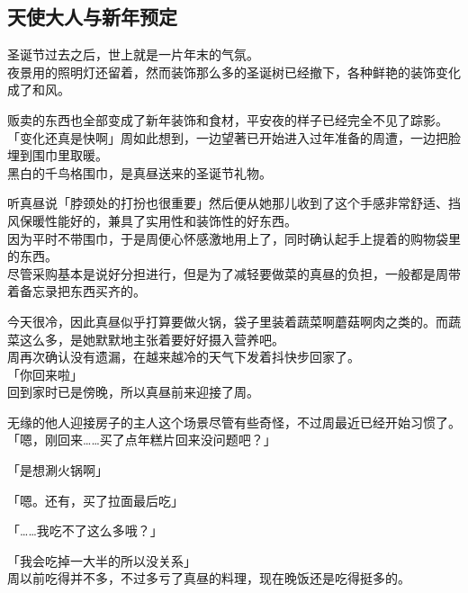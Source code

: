 \subsection{天使大人与新年预定}

圣诞节过去之后，世上就是一片年末的气氛。\\

夜景用的照明灯还留着，然而装饰那么多的圣诞树已经撤下，各种鲜艳的装饰变化成了和风。

贩卖的东西也全部变成了新年装饰和食材，平安夜的样子已经完全不见了踪影。\\

「变化还真是快啊」周如此想到，一边望著已开始进入过年准备的周遭，一边把脸埋到围巾里取暖。\\

黑白的千鸟格围巾，是真昼送来的圣诞节礼物。

听真昼说「脖颈处的打扮也很重要」然后便从她那儿收到了这个手感非常舒适、挡风保暖性能好的，兼具了实用性和装饰性的好东西。\\

因为平时不带围巾，于是周便心怀感激地用上了，同时确认起手上提着的购物袋里的东西。\\

尽管采购基本是说好分担进行，但是为了减轻要做菜的真昼的负担，一般都是周带着备忘录把东西买齐的。

今天很冷，因此真昼似乎打算要做火锅，袋子里装着蔬菜啊蘑菇啊肉之类的。而蔬菜这么多，是她默默地主张着要好好摄入营养吧。\\

周再次确认没有遗漏，在越来越冷的天气下发着抖快步回家了。\\

「你回来啦」\\

回到家时已是傍晚，所以真昼前来迎接了周。

无缘的他人迎接房子的主人这个场景尽管有些奇怪，不过周最近已经开始习惯了。\\

「嗯，刚回来……买了点年糕片回来没问题吧？」

「是想涮火锅啊」

「嗯。还有，买了拉面最后吃」

「……我吃不了这么多哦？」

「我会吃掉一大半的所以没关系」\\

周以前吃得并不多，不过多亏了真昼的料理，现在晚饭还是吃得挺多的。\\

